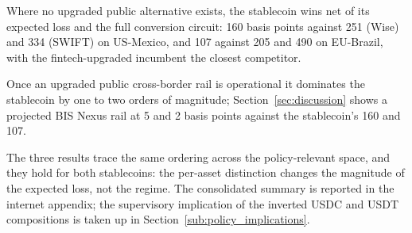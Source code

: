 \begin{result}\label{res:wins}
Where no upgraded public alternative exists, the stablecoin wins net of its expected loss and the full conversion circuit: 160 basis points against 251 (Wise) and 334 (SWIFT) on US-Mexico, and 107 against 205 and 490 on EU-Brazil, with the fintech-upgraded incumbent the closest competitor.
\end{result}

\begin{result}\label{res:absorbed}
Once an upgraded public cross-border rail is operational it dominates the stablecoin by one to two orders of magnitude; Section~\ref{sec:discussion} shows a projected BIS Nexus rail at 5 and 2 basis points against the stablecoin's 160 and 107.
\end{result}

The three results trace the same ordering across the policy-relevant space, and they hold for both stablecoins: the per-asset distinction changes the magnitude of the expected loss, not the regime. The consolidated summary is reported in the internet appendix; the supervisory implication of the inverted USDC and USDT compositions is taken up in Section~\ref{sub:policy_implications}.
